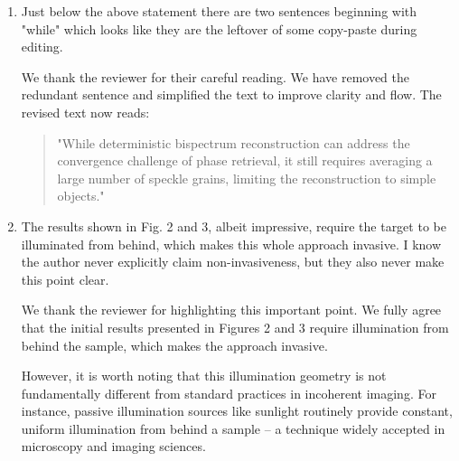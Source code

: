 \documentclass[12pt]{article}
\newcommand{\hlred}[1]{\sethlcolor{red!30}\hl{#1}}
\newenvironment{solved_reviewercomment}
    {\begin{tcolorbox}[width=\linewidth,colback=gray!5,colframe=solved_commentcolor!50,title=Reviewer Comment,left=5pt,right=5pt]}
    {\end{tcolorbox}}
\newenvironment{ourresponse}
    {\begin{tcolorbox}[width=\linewidth,breakable,enhanced,colback=gray!5,colframe=responsecolor!50,title=Response,left=5pt,right=5pt]}
    {\end{tcolorbox}}
\begin{document}
\begin{enumerate}[label=\arabic*.]
\begin{enumerate}[label=3.\alph*.]
        \item \leavevmode\vspace{-\baselineskip}
        \begin{solved_reviewercomment}
            Just below the above statement there are two sentences beginning with "while" which looks like they are the leftover of some copy-paste during editing.
        \end{solved_reviewercomment}
        \begin{ourresponse}
            We thank the reviewer for their careful reading. We have removed the redundant sentence and simplified the text to improve clarity and flow. The revised text now reads:
            \begin{quote}
                "While deterministic bispectrum reconstruction can address the convergence challenge of phase retrieval, it still requires averaging a large number of speckle grains, limiting the reconstruction to simple objects."
            \end{quote}
        \end{ourresponse}
        \item \leavevmode\vspace{-\baselineskip}
        \begin{solved_reviewercomment}
            The results shown in Fig. 2 and 3, albeit impressive, require the target to be illuminated from behind, which makes this whole approach invasive. I know the author never explicitly claim non-invasiveness, but they also never make this point clear.
        \end{solved_reviewercomment}
        \begin{ourresponse}
            We thank the reviewer for highlighting this important point.
            We fully agree that the initial results presented in Figures 2 and 3 require illumination from behind the sample, which makes the approach invasive. 
            
            However, it is worth noting that this illumination geometry is not fundamentally different from standard practices in incoherent imaging. For instance, passive illumination sources like sunlight routinely provide constant, uniform illumination from behind a sample – a technique widely accepted in microscopy and imaging sciences.
            

\end{ourresponse}
\end{enumerate}
\end{enumerate}
\end{document}
